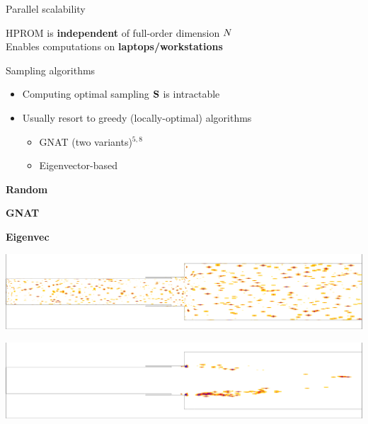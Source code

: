 \documentclass[]{beamer}
\begin{document}
\begin{frame}{Parallel scalability}
\begin{figure}
\begin{minipage}{0.4\linewidth}
		\end{minipage}
	\end{figure}
	\begin{tcolorbox}[colframe=blue!50!white,halign=center]
		HPROM is \textbf{independent} of full-order dimension $N$ \\
		Enables computations on \textbf{laptops/workstations} 
	\end{tcolorbox}
\end{frame}

\begin{frame}{Sampling algorithms}
    \begin{itemize}
		\item Computing optimal sampling $\mathbf{S}$ is intractable
		\item Usually resort to greedy (locally-optimal) algorithms
		\begin{itemize}
			\item GNAT (two variants)$^{5,8}$
			\item Eigenvector-based\footnotemark[8]
		\end{itemize}
	\end{itemize}
	\vspace{-1em}
	\begin{minipage}{0.13\linewidth}
		\footnotesize
		\vspace{3.9em}
		\textbf{Random}
		\normalsize

		\vspace{3em}

		\footnotesize
		\textbf{GNAT}

		\vspace{3.7em}

		\footnotesize
		\textbf{Eigenvec}

		\vspace{4em}
	\end{minipage}
	\centering
	\begin{minipage}{0.8\linewidth}
		\includegraphics[width=0.85\linewidth,trim={0.2em 2em 0.3em 2em},clip]{Images/theory/iblanks/random_iblank_z.png}

		\includegraphics[width=0.85\linewidth,trim={0.2em 2em 0.3em 2em},clip]{Images/theory/iblanks/greedy_ben_iblank_z.png}


\end{minipage}
\end{frame}
\end{document}
